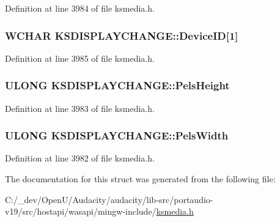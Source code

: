 Definition at line 3984 of file ksmedia.\+h.

\subsubsection[{\texorpdfstring{Device\+ID}{DeviceID}}]{\setlength{\rightskip}{0pt plus 5cm}W\+C\+H\+AR K\+S\+D\+I\+S\+P\+L\+A\+Y\+C\+H\+A\+N\+G\+E\+::\+Device\+ID\mbox{[}1\mbox{]}}\hypertarget{struct_k_s_d_i_s_p_l_a_y_c_h_a_n_g_e_a526e04c64b3e2b03185725b6cf142021}{}\label{struct_k_s_d_i_s_p_l_a_y_c_h_a_n_g_e_a526e04c64b3e2b03185725b6cf142021}


Definition at line 3985 of file ksmedia.\+h.

\subsubsection[{\texorpdfstring{Pels\+Height}{PelsHeight}}]{\setlength{\rightskip}{0pt plus 5cm}U\+L\+O\+NG K\+S\+D\+I\+S\+P\+L\+A\+Y\+C\+H\+A\+N\+G\+E\+::\+Pels\+Height}\hypertarget{struct_k_s_d_i_s_p_l_a_y_c_h_a_n_g_e_ae85de154aa62518ccd7cf9e1fd9577ab}{}\label{struct_k_s_d_i_s_p_l_a_y_c_h_a_n_g_e_ae85de154aa62518ccd7cf9e1fd9577ab}


Definition at line 3983 of file ksmedia.\+h.

\subsubsection[{\texorpdfstring{Pels\+Width}{PelsWidth}}]{\setlength{\rightskip}{0pt plus 5cm}U\+L\+O\+NG K\+S\+D\+I\+S\+P\+L\+A\+Y\+C\+H\+A\+N\+G\+E\+::\+Pels\+Width}\hypertarget{struct_k_s_d_i_s_p_l_a_y_c_h_a_n_g_e_a0833b0bb68805d52a74c146f3e92db67}{}\label{struct_k_s_d_i_s_p_l_a_y_c_h_a_n_g_e_a0833b0bb68805d52a74c146f3e92db67}


Definition at line 3982 of file ksmedia.\+h.



The documentation for this struct was generated from the following file\+:\begin{DoxyCompactItemize}
\item 
C\+:/\+\_\+dev/\+Open\+U/\+Audacity/audacity/lib-\/src/portaudio-\/v19/src/hostapi/wasapi/mingw-\/include/\hyperlink{ksmedia_8h}{ksmedia.\+h}\end{DoxyCompactItemize}
